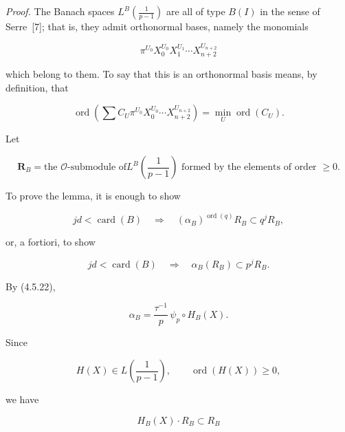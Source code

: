 \noindent\emph{Proof.}
The Banach spaces
$L^B\!\left(\frac1{p-1}\right)$ are all of type $B(I)$ in the sense of
Serre~[7]; that is, they admit orthonormal bases, namely the monomials

\begin{equation}\tag{4.6.9}
\pi^{U_0}X_0^{U_0}X_1^{U_1}\cdots X_{n+2}^{U_{n+2}}
\end{equation}

\noindent
which belong to them.  To say that this is an orthonormal basis means, by
definition, that

\begin{equation}\tag{4.6.10}
\operatorname{ord}\!\left(
\sum C_U\pi^{U_0}X_0^{U_0}\cdots X_{n+2}^{U_{n+2}}
\right)
=\min_U\operatorname{ord}(C_U).
\end{equation}

Let

\begin{equation}\tag{4.6.11}
\mathbf R_B=\text{the $\mathcal O$-submodule of
$L^B\!\left(\frac1{p-1}\right)$ formed by the elements of order $\geq0$}.
\end{equation}

To prove the lemma, it is enough to show

\begin{equation}\tag{4.6.12}
jd<\operatorname{card}(B)
\quad\Longrightarrow\quad
(\alpha_B)^{\operatorname{ord}(q)}R_B\subset q^jR_B,
\end{equation}

or, a fortiori, to show

\begin{equation}\tag{4.6.13}
jd<\operatorname{card}(B)
\quad\Longrightarrow\quad
\alpha_B(R_B)\subset p^jR_B.
\end{equation}

By (4.5.22),

\begin{equation}\tag{4.6.14}
\alpha_B=\frac{\tau^{-1}}p\,\psi_p\circ H_B(X).
\end{equation}

Since

\begin{equation}\tag{4.6.15}
H(X)\in L\!\left(\frac1{p-1}\right),
\qquad \operatorname{ord}(H(X))\geq0,
\end{equation}

we have

\begin{equation}\tag{4.6.16}
H_B(X)\cdot R_B\subset R_B
\end{equation}

